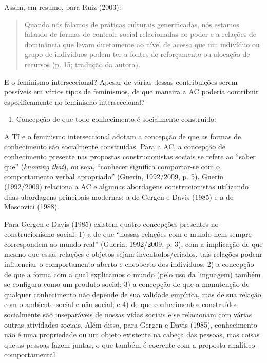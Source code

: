 Assim, em resumo, para Ruiz (2003):

\begin{quote}
    Quando nós falamos de práticas culturais generificadas, nós estamos falando de formas de controle social relacionadas ao poder e a relações de dominância que levam diretamente ao nível de acesso que um indivíduo ou grupo de indivíduos podem ter a fontes de reforçamento ou alocação de recursos (p. 15; tradução da autora).
\end{quote}

E o feminismo interseccional? Apesar de várias dessas contribuições serem possíveis em vários tipos de feminismos, de que maneira a AC poderia contribuir especificamente no feminismo interseccional?

\begin{enumerate}
    \item Concepção de que todo conhecimento é socialmente construído:
\end{enumerate}

A TI e o feminismo interseccional adotam a concepção de que as formas de conhecimento são socialmente construídas. Para a AC, a concepção de conhecimento presente nas propostas construcionistas sociais se refere ao ``saber que'' (\textit{knowing that}), ou seja, ``conhecer significa comportar-se com o comportamento verbal apropriado'' (Guerin, 1992/2009, p. 5). Guerin (1992/2009) relaciona a AC e algumas abordagens construcionistas utilizando duas abordagens principais modernas: a de Gergen e Davis (1985) e a de Moscovici (1988).

Para Gergen e Davis (1985) existem quatro concepções presentes no construcionismo social: 1) a de que ``nossas relações com o mundo nem sempre correspondem ao mundo real'' (Guerin, 1992/2009, p. 3), com a implicação de que mesmo que essas relações e objetos sejam inventados/criados, tais relações podem influenciar o comportamento aberto e encoberto dos indivíduos; 2) a concepção de que a forma com a qual explicamos o mundo (pelo uso da linguagem) também se configura como um produto social; 3) a concepção de que a manutenção de qualquer conhecimento não depende de sua validade empírica, mas de sua relação com o ambiente social e não social; e 4) de que conhecimentos construídos socialmente são inseparáveis de nossas vidas sociais e se relacionam com várias outras atividades sociais. Além disso, para Gergen e Davis (1985), conhecimento não é uma propriedade ou um objeto existente na cabeça das pessoas, mas coisas que as pessoas fazem juntas, o que também é coerente com a proposta analítico-comportamental.

